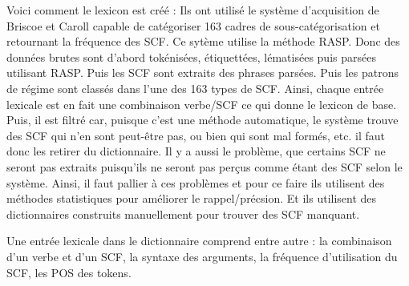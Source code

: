 Voici comment le lexicon est créé : Ils ont utilisé le système d'acquisition de Briscoe et Caroll \citep{BriscoeSecondReleaseRASP2006} capable de catégoriser 163 cadres de sous-catégorisation et retournant la fréquence des SCF. Ce sytème utilise la méthode RASP. Donc des données brutes sont d'abord tokénisées, étiquettées, lématisées puis parsées utilisant RASP. Puis les SCF sont extraits des phrases parsées. Puis les patrons de régime sont classés dans l'une des 163 types de SCF. Ainsi, chaque entrée lexicale est en fait une combinaison verbe/SCF ce qui donne le lexicon de base. Puis, il est filtré car, puisque c'est une méthode automatique, le système trouve des SCF qui n'en sont peut-être pas, ou bien qui sont mal formés, etc. il faut donc les retirer du dictionnaire. Il y a aussi le problème, que certains SCF ne seront pas extraits puisqu'ils ne seront pas perçus comme étant des SCF selon le système. Ainsi, il faut pallier à ces problèmes et pour ce faire ils utilisent des méthodes statistiques pour améliorer le rappel/précsion. Et ils utilisent des dictionnaires construits manuellement pour trouver des SCF manquant. 

Une entrée lexicale dans le dictionnaire comprend entre autre : la combinaison d'un verbe et d'un SCF, la syntaxe des arguments, la fréquence d'utilisation du SCF, les POS des tokens.

